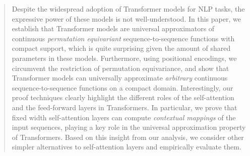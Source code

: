 \begin{abstract}
Despite the widespread adoption of Transformer models for NLP tasks, the expressive power of these models is not well-understood. In this paper, we establish that Transformer models are universal approximators of continuous {\em permutation equivariant} sequence-to-sequence functions with compact support, which is quite surprising given the amount of shared parameters in these models. Furthermore, using positional encodings, we circumvent the restriction of permutation equivariance, and show that Transformer models can universally approximate {\em arbitrary} continuous sequence-to-sequence functions on a compact domain. Interestingly, our proof techniques clearly highlight the different roles of the self-attention and the feed-forward layers in Transformers. In particular, we prove that fixed width self-attention layers can compute \emph{contextual mappings} of the input sequences, playing a key role in the universal approximation property of Transformers. Based on this insight from our analysis, we consider other simpler alternatives to self-attention layers and empirically evaluate them.
\end{abstract}






